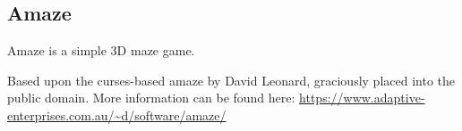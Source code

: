 \subsection{Amaze}
Amaze is a simple 3D maze game.

Based upon the curses-based amaze by David Leonard, graciously placed
into the public domain. More information can be found here: \url{https://www.adaptive-enterprises.com.au/~d/software/amaze/}
